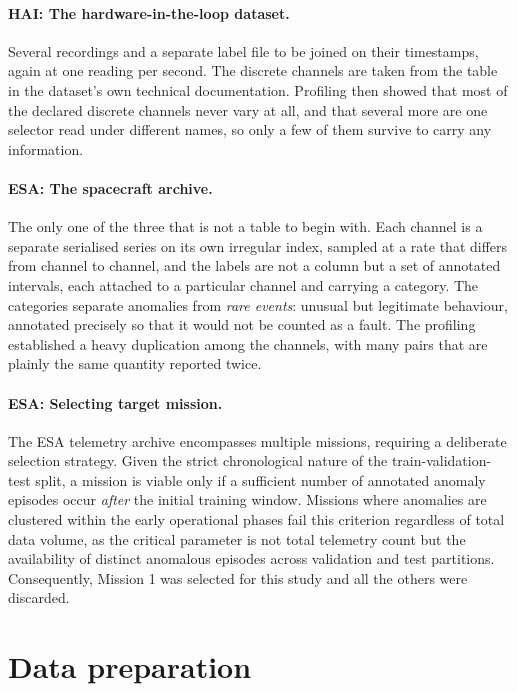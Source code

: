 \documentclass{article}
\begin{document}
\paragraph{HAI: The hardware-in-the-loop dataset.} Several recordings and a separate label file
to be joined on their timestamps, again at one reading per second. The discrete channels
are taken from the table in the dataset's own technical documentation.
Profiling then showed that most of the declared discrete channels never
vary at all, and that several more are one selector read under different names, so only a
few of them survive to carry any information.

\paragraph{ESA: The spacecraft archive.} The only one of the three that is not a table to begin
with. Each channel is a separate serialised series on its own irregular index, sampled at
a rate that differs from channel to channel, and the labels are not a column but a set of
annotated intervals, each attached to a particular channel and carrying a category.
The categories separate anomalies from \emph{rare events}: unusual but
legitimate behaviour, annotated precisely so that it would not be counted as a fault. 
The profiling established a heavy duplication among the channels, with many pairs that are plainly the same quantity reported twice.

\paragraph{ESA: Selecting target mission.} The ESA telemetry archive encompasses multiple missions, 
requiring a deliberate selection strategy.
Given the strict chronological nature of the train-validation-test split, 
a mission is viable only if a sufficient number of annotated anomaly episodes occur \emph{after} the initial training window. 
Missions where anomalies are clustered within the early operational phases fail this criterion regardless of total data volume, 
as the critical parameter is not total telemetry count but the availability of distinct anomalous episodes across validation and test partitions. 
Consequently, Mission 1 was selected for this study and all the others were discarded.

\section{Data preparation}
\end{document}
